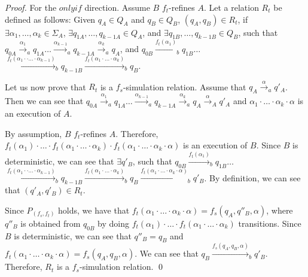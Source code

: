 \begin {proof}
For the $\mathit{only if}$ direction. Assume $B$ $f_t$-refines $A$. Let a relation $R_t$ be defined as follows: Given $q_A \in Q_A$ and $q_B \in Q_B$, $(q_A,q_B) \in R_t$, if $\exists \alpha_1, \ldots, \alpha_k \in \Sigma_A$, $\exists q_{1A},\ldots,q_{k-1A} \in Q_A$, and $\exists q_{1B},\ldots,q_{k-1B} \in Q_B$, such that $q_{0A} {\xrightarrow{\alpha_1}}_a q_{1A} \ldots {\xrightarrow{\alpha_{k-1}}}_a q_{k-1A} {\xrightarrow{\alpha_k}}_a q_A$, and $q_{0B} {\xrightarrow{f_t(\alpha_1)}}_b q_{1B} \ldots$ ${\xrightarrow{f_t(\alpha_1 \cdot \cdot \ldots \cdot \alpha_{k-1})}}_b q_{k-1B} {\xrightarrow{f_t(\alpha_1 \cdot \ldots \cdot \alpha_k)}}_b q_B$.

Let us now prove that $R_t$ is a $f_s$-simulation relation. Assume that $q_A {\xrightarrow{\alpha}}_a q'_A$. Then we can see that $q_{0A} {\xrightarrow{\alpha_1}}_a q_{1A} \ldots {\xrightarrow{\alpha_{k-1}}}_a q_{k-1A} {\xrightarrow{\alpha_k}}_a q_A {\xrightarrow{\alpha}}_A q'_A$ and $\alpha_1 \cdot \ldots \cdot \alpha_k \cdot \alpha$ is an execution of $A$.

By assumption, $B$ $f_t$-refines $A$. Therefore, $f_t(\alpha_1) \cdot \ldots \cdot f_t(\alpha_1 \cdot \ldots \cdot \alpha_k) \cdot f_t(\alpha_1 \cdot \ldots \cdot \alpha_k \cdot \alpha)$ is an execution of $B$. Since $B$ is deterministic, we can see that $\exists q'_B$, such that $q_{0B} {\xrightarrow{f_t(\alpha_1)}}_b q_{1B} \ldots$ ${\xrightarrow{f_t(\alpha_1 \cdot \cdot \ldots \cdot \alpha_{k-1})}}_b q_{k-1B} {\xrightarrow{f_t(\alpha_1 \cdot \ldots \cdot \alpha_k)}}_b q_B {\xrightarrow{f_t(\alpha_1 \cdot \ldots \cdot \alpha_k \cdot \alpha)}}_b q'_B$. By definition, we can see that $(q'_A,q'_B) \in R_t$.

Since $P_{(f_s,f_t)}$ holds, we have that $f_t(\alpha_1 \cdot \ldots \cdot \alpha_k \cdot \alpha) = f_s(q_A,q''_B,\alpha)$, where $q''_B$ is obtained from $q_{0B}$ by doing $f_t(\alpha_1) \cdot \ldots \cdot f_t(\alpha_1 \cdot \ldots \cdot \alpha_k)$ transitions. Since $B$ is deterministic, we can see that $q''_B = q_B$ and $f_t(\alpha_1 \cdot \ldots \cdot \alpha_k \cdot \alpha) = f_s(q_A,q_B,\alpha)$. We can see that $q_B {\xrightarrow{f_s(q_A,q_B,\alpha)}}_b q'_B$. Therefore, $R_t$ is a $f_s$-simulation relation. \qed
\end {proof}

